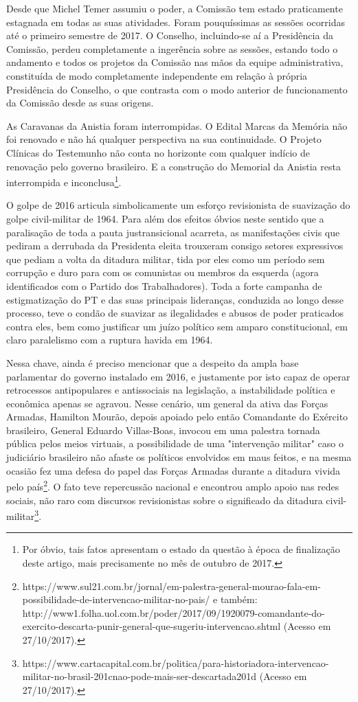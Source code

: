 Desde que Michel Temer assumiu o poder, a Comissão tem estado
praticamente estagnada em todas as suas atividades. Foram pouquíssimas
as sessões ocorridas até o primeiro semestre de 2017. O Conselho,
incluindo-se aí a Presidência da Comissão, perdeu completamente a
ingerência sobre as sessões, estando todo o andamento e todos os
projetos da Comissão nas mãos da equipe administrativa, constituída de
modo completamente independente em relação à própria Presidência do
Conselho, o que contrasta com o modo anterior de funcionamento da
Comissão desde as suas origens.

As Caravanas da Anistia foram interrompidas. O Edital Marcas da Memória
não foi renovado e não há qualquer perspectiva na sua continuidade. O
Projeto Clínicas do Testemunho não conta no horizonte com qualquer
indício de renovação pelo governo brasileiro. E a construção do Memorial
da Anistia resta interrompida e inconclusa\footnote{Por óbvio, tais
  fatos apresentam o estado da questão à época de finalização deste
  artigo, mais precisamente no mês de outubro de 2017.}.

O golpe de 2016 articula simbolicamente um esforço revisionista de
suavização do golpe civil-militar de 1964. Para além dos efeitos óbvios
neste sentido que a paralisação de toda a pauta justransicional
acarreta, as manifestações civis que pediram a derrubada da Presidenta
eleita trouxeram consigo setores expressivos que pediam a volta da
ditadura militar, tida por eles como um período sem corrupção e duro
para com os comunistas ou membros da esquerda (agora identificados com o
Partido dos Trabalhadores). Toda a forte campanha de estigmatização do
PT e das suas principais lideranças, conduzida ao longo desse processo,
teve o condão de suavizar as ilegalidades e abusos de poder praticados
contra eles, bem como justificar um juízo político sem amparo
constitucional, em claro paralelismo com a ruptura havida em 1964.

Nessa chave, ainda é preciso mencionar que a despeito da ampla base
parlamentar do governo instalado em 2016, e justamente por isto capaz de
operar retrocessos antipopulares e antissociais na legislação, a
instabilidade política e econômica apenas se agravou. Nesse cenário, um
general da ativa das Forças Armadas, Hamilton Mourão, depois apoiado
pelo então Comandante do Exército brasileiro, General Eduardo
Villas-Boas, invocou em uma palestra tornada pública pelos meios
virtuais, a possibilidade de uma "intervenção militar" caso o judiciário
brasileiro não afaste os políticos envolvidos em maus feitos, e na mesma
ocasião fez uma defesa do papel das Forças Armadas durante a ditadura
vivida pelo país\footnote{https://www.sul21.com.br/jornal/em-palestra-general-mourao-fala-em-possibilidade-de-intervencao-militar-no-pais/
  e também:
  http://www1.folha.uol.com.br/poder/2017/09/1920079-comandante-do-exercito-descarta-punir-general-que-sugeriu-intervencao.shtml
  (Acesso em 27/10/2017).}. O fato teve repercussão nacional e encontrou
amplo apoio nas redes sociais, não raro com discursos revisionistas
sobre o significado da ditadura civil-militar\footnote{https://www.cartacapital.com.br/politica/para-historiadora-intervencao-militar-no-brasil-201cnao-pode-mais-ser-descartada201d
  (Acesso em 27/10/2017).}.

